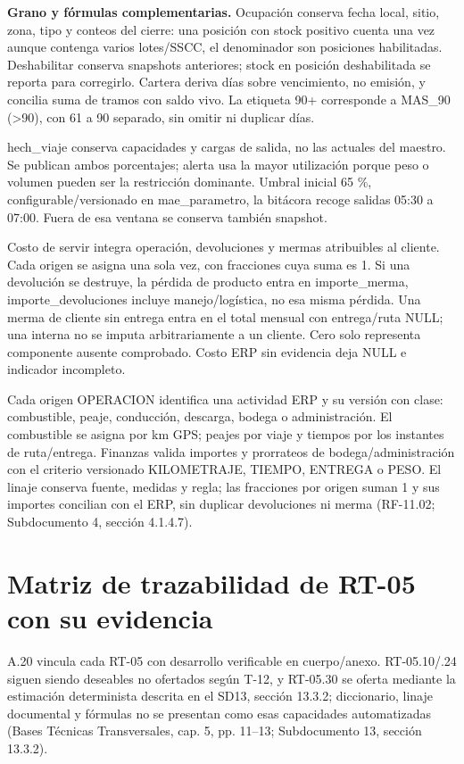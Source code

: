 \textbf{Grano y fórmulas complementarias.} Ocupación conserva fecha local, sitio, zona, tipo y conteos del cierre: una posición con stock positivo cuenta una vez aunque contenga varios lotes/SSCC, el denominador son posiciones habilitadas. Deshabilitar conserva snapshots anteriores; stock en posición deshabilitada se reporta para corregirlo. Cartera deriva días sobre vencimiento, no emisión, y concilia suma de tramos con saldo vivo. La etiqueta 90+ corresponde a MAS\_90 (>90), con 61 a 90 separado, sin omitir ni duplicar días.

hech\_viaje conserva capacidades y cargas de salida, no las actuales del maestro. Se publican ambos porcentajes; alerta usa la mayor utilización porque peso o volumen pueden ser la restricción dominante. Umbral inicial 65 \%, configurable/versionado en mae\_parametro, la bitácora recoge salidas 05:30 a 07:00. Fuera de esa ventana se conserva también snapshot.

Costo de servir integra operación, devoluciones y mermas atribuibles al cliente. Cada origen se asigna una sola vez, con fracciones cuya suma es 1. Si una devolución se destruye, la pérdida de producto entra en importe\_merma, importe\_devoluciones incluye manejo/logística, no esa misma pérdida. Una merma de cliente sin entrega entra en el total mensual con entrega/ruta NULL; una interna no se imputa arbitrariamente a un cliente. Cero solo representa componente ausente comprobado. Costo ERP sin evidencia deja NULL e indicador incompleto.

Cada origen OPERACION identifica una actividad ERP y su versión con clase: combustible, peaje, conducción, descarga, bodega o administración. El combustible se asigna por km GPS; peajes por viaje y tiempos por los instantes de ruta/entrega. Finanzas valida importes y prorrateos de bodega/administración con el criterio versionado KILOMETRAJE, TIEMPO, ENTREGA o PESO. El linaje conserva fuente, medidas y regla; las fracciones por origen suman 1 y sus importes concilian con el ERP, sin duplicar devoluciones ni merma (RF-11.02; Subdocumento 4, sección 4.1.4.7).

\section{Matriz de trazabilidad de RT-05 con su evidencia}
\label{anexo-5i}

A.20 vincula cada RT-05 con desarrollo verificable en cuerpo/anexo. RT-05.10/.24 siguen siendo deseables no ofertados según T-12, y RT-05.30 se oferta mediante la estimación determinista descrita en el SD13, sección 13.3.2; diccionario, linaje documental y fórmulas no se presentan como esas capacidades automatizadas (Bases Técnicas Transversales, cap. 5, pp. 11–13; Subdocumento 13, sección 13.3.2).

